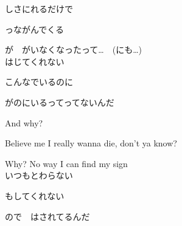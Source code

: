 しさにれるだけで

っながんでくる

が　がいなくなったって…　(にも…)
\\

はじてくれない

こんなでいるのに

がのにいるってってないんだ

And why?

Believe me I really wanna die, don't ya know?

Why? No way I can find my sign
\\

いつもとわらない

もしてくれない

ので　はされてるんだ
\\
